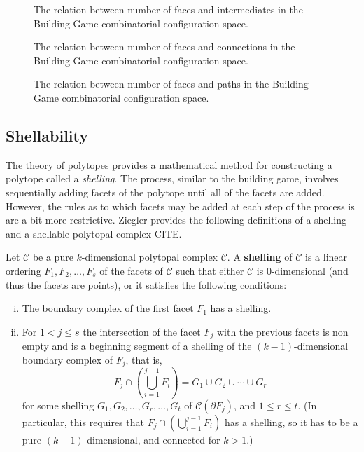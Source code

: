 \begin{figure}[ht]
\caption{The relation between number of faces and intermediates in the Building Game combinatorial configuration space.}
\label{fig:FacInt}
\end{figure}

\begin{figure}[ht]
\caption{The relation between number of faces and connections in the Building Game combinatorial configuration space.}
\label{fig:FacCon}
\end{figure}

\begin{figure}[ht]
\caption{The relation between number of faces and paths in the Building Game combinatorial configuration space.}
\label{fig:FacPath}
\end{figure}



\subsection{Shellability}
The theory of polytopes provides a mathematical method for constructing a polytope called a \textit{shelling}. The process, similar to the building game, involves sequentially adding facets of the polytope until all of the facets are added. However, the rules as to which facets may be added at each step of the process is are a bit more restrictive. Ziegler provides the following definitions of a shelling and a shellable polytopal complex CITE. 
\begin{mydef}
\label{def:shelling}
Let $\mathcal{C}$ be a pure $k$-dimensional polytopal complex $\mathcal{C}$. A \textbf{shelling} of $\mathcal{C}$ is a linear ordering $F_1,F_2,\dots,F_s$ of the facets of $\mathcal{C}$ such that either $\mathcal{C}$ is $0$-dimensional (and thus the facets are points), or it satisfies the following conditions:
\begin{enumerate}[(i)]
\item The boundary complex of the first facet $F_1$ has a shelling.
\item For $1 < j \leq s$ the intersection of the facet $F_j$ with the previous facets is non empty and is a beginning segment of a shelling of the $(k-1)$-dimensional boundary complex of $F_j$, that is,
$$F_j \cap \left(\bigcup_{i=1}^{j-1}F_i\right) = G_1 \cup G_2 \cup \cdots \cup G_r$$
for some shelling $G_1, G_2, \dots, G_r, \dots, G_t$ of $\mathcal{C}(\partial F_j)$, and $1 \leq r \leq t$. (In particular, this requires that $F_j \cap (\bigcup_{i=1}^{j-1} F_i)$ has a shelling, so it has to be a pure $(k-1)$-dimensional, and connected for $k > 1$.)
\end{enumerate} 
\end{mydef}

